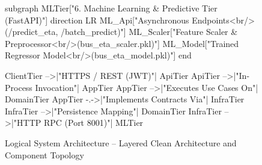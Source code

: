 \begin{figure}[H]
\begin{mermaid}[width=0.55\textwidth,height=0.78\textheight,keepaspectratio]
    subgraph MLTier["6. Machine Learning & Predictive Tier (FastAPI)"]
        direction LR
        ML_Api["Asynchronous Endpoints<br/>(/predict_eta, /batch_predict)"]
        ML_Scaler["Feature Scaler & Preprocessor<br/>(bus_eta_scaler.pkl)"]
        ML_Model["Trained Regressor Model<br/>(bus_eta_model.pkl)"]
    end

    ClientTier -->|"HTTPS / REST (JWT)"| ApiTier
    ApiTier -->|"In-Process Invocation"| AppTier
    AppTier -->|"Executes Use Cases On"| DomainTier
    AppTier -.->|"Implements Contracts Via"| InfraTier
    InfraTier -->|"Persistence Mapping"| DomainTier
    InfraTier -->|"HTTP RPC (Port 8001)"| MLTier
  \end{mermaid}
  \caption{Logical System Architecture -- Layered Clean Architecture and Component Topology}
  \label{fig:logical_architecture}
\end{figure}

